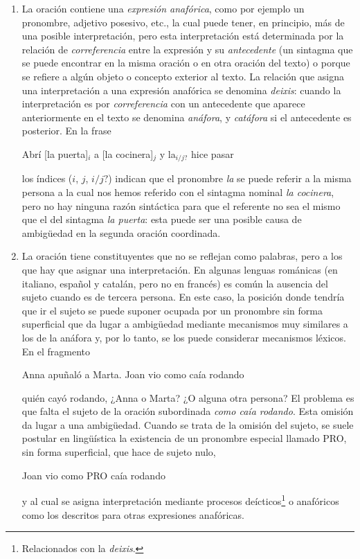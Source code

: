 \begin{enumerate}
\item La oración contiene una \emph{expresión anafórica}, como por ejemplo un pronombre, adjetivo posesivo, etc., la cual puede tener, en principio, más de una posible interpretación, pero esta interpretación está determinada por la relación de \emph{correferencia} entre la expresión y su \emph{antecedente} (un sintagma que se puede encontrar en la misma oración o en otra oración del texto) o porque se refiere a algún objeto o concepto exterior al texto. La relación que asigna una interpretación a una expresión anafórica se denomina \emph{deixis}: cuando la interpretación es por \emph{correferencia} con un antecedente que aparece anteriormente en el texto se denomina \emph{anáfora}\label{pg:anafora}, y \emph{catáfora} si el antecedente es posterior. En la frase \begin{exemple} Abrí [la puerta]$_i$ a [la cocinera]$_j$ y la$_{i/j?}$ hice pasar \end{exemple} los índices ($i$, $j$, $i/j?$) indican que el pronombre \emph{la } se puede referir a la misma persona a la cual nos hemos referido con el sintagma nominal \emph{la cocinera}, pero no hay ninguna razón sintáctica para que el referente no sea el mismo que el del sintagma \emph{la puerta}: esta puede ser una posible causa de ambigüedad en la segunda oración coordinada. 

\item La oración tiene constituyentes que no se reflejan como palabras, pero a los que hay que asignar una interpretación. En algunas lenguas románicas (en italiano, español y catalán, pero no en francés) es común la ausencia del sujeto cuando es de tercera persona. En este caso, la posición donde tendría que ir el sujeto se puede suponer ocupada por un pronombre sin forma superficial que da lugar a ambigüedad mediante mecanismos muy similares a los de la anáfora y, por lo tanto, se los puede considerar mecanismos léxicos. En el fragmento \begin{exemple} Anna apuñaló a Marta. Joan vio como caía rodando \end{exemple} quién cayó rodando, ¿Anna o Marta? ¿O alguna otra persona? El problema es que falta el sujeto de la oración subordinada \emph{como caía rodando}. Esta omisión da lugar a una ambigüedad. Cuando se trata de la omisión del sujeto, se suele postular en lingüística la existencia de un pronombre especial llamado PRO, sin forma superficial, que hace de sujeto nulo, \begin{exemple} Joan vio como PRO caía rodando \end{exemple} y al cual se asigna interpretación mediante procesos deícticos\footnote{Relacionados con la \emph{deixis}.} o anafóricos como los descritos para otras expresiones anafóricas. 


\end{enumerate}
